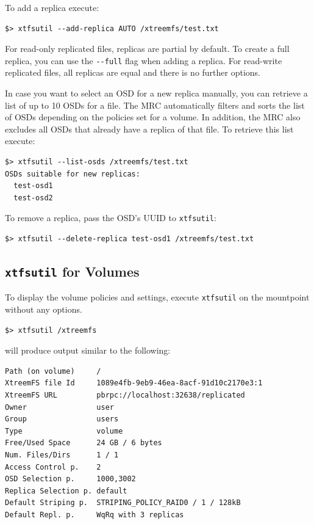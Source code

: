 \documentclass[a4paper,10pt]{book}
\begin{document}
To add a replica execute:

\begin{verbatim}
$> xtfsutil --add-replica AUTO /xtreemfs/test.txt
\end{verbatim}

For read-only replicated files, replicas are partial by default. To create a full replica, you can use the \verb|--full| flag when adding a replica. For read-write replicated files, all replicas are equal and there is no further options.

In case you want to select an OSD for a new replica manually, you can retrieve a list of up to 10 OSDs for a file. The MRC automatically filters and sorts the list of OSDs depending on the policies set for a volume. In addition, the MRC also excludes all OSDs that already have a replica of that file. To retrieve this list execute:

\begin{verbatim}
$> xtfsutil --list-osds /xtreemfs/test.txt
OSDs suitable for new replicas: 
  test-osd1
  test-osd2
\end{verbatim}

To remove a replica, pass the OSD's UUID to \texttt{xtfsutil}:

\begin{verbatim}
$> xtfsutil --delete-replica test-osd1 /xtreemfs/test.txt
\end{verbatim}

\subsection{\texttt{xtfsutil} for Volumes}
\label{sec:xtfsutil_volumes}

To display the volume policies and settings, execute \texttt{xtfsutil} on the mountpoint without any options.

\begin{verbatim}
$> xtfsutil /xtreemfs
\end{verbatim}

will produce output similar to the following:

\begin{verbatim}
Path (on volume)     /
XtreemFS file Id     1089e4fb-9eb9-46ea-8acf-91d10c2170e3:1
XtreemFS URL         pbrpc://localhost:32638/replicated
Owner                user
Group                users
Type                 volume
Free/Used Space      24 GB / 6 bytes
Num. Files/Dirs      1 / 1
Access Control p.    2
OSD Selection p.     1000,3002
Replica Selection p. default
Default Striping p.  STRIPING_POLICY_RAID0 / 1 / 128kB
Default Repl. p.     WqRq with 3 replicas
\end{verbatim}
\end{document}
